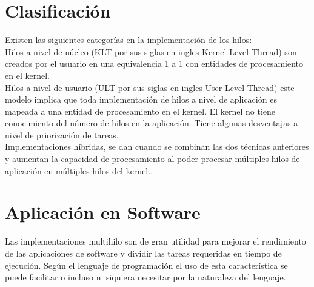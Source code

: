\documentclass[]{article}
\begin{document}
\begin{multicols}{2}
		\section{Clasificación}
		Existen las siguientes categorías en la implementación de los hilos:\\
		Hilos a nivel de núcleo (KLT por sus siglas en ingles Kernel Level Thread) son creados por el usuario en una equivalencia 1 a 1 con entidades de procesamiento en el kernel.\\
		Hilos a nivel de usuario (ULT por sus siglas en ingles User Level Thread) este modelo implica que toda implementación de hilos a nivel de aplicación es mapeada a una entidad de procesamiento en el kernel. El kernel no tiene conocimiento del número de hilos en la aplicación. Tiene algunas desventajas a nivel de priorización de tareas.\\
		Implementaciones híbridas, se dan cuando se combinan las dos técnicas anteriores y aumentan la capacidad de procesamiento al poder procesar múltiples hilos de aplicación en múltiples hilos del kernel.\cite{wiki}.\\
		\section{Aplicación en Software}
		Las implementaciones multihilo son de gran utilidad para mejorar el rendimiento de las aplicaciones de software y dividir las tareas requeridas en tiempo de ejecución. Según el lenguaje de programación el uso de esta característica se puede facilitar o incluso ni siquiera necesitar por la naturaleza del lenguaje.
		
		\printbibliography
	\end{multicols}
	
\end{document}
